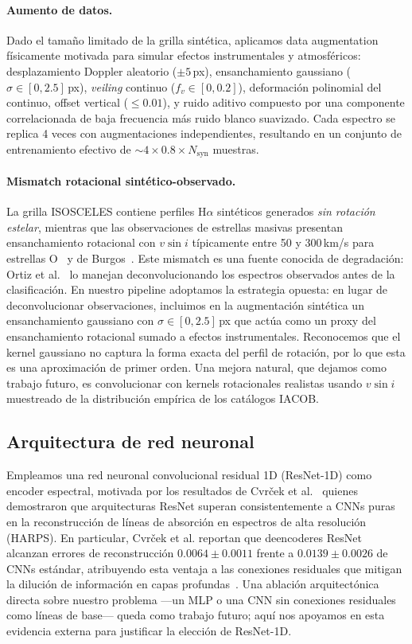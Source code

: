 \documentclass[sigconf,ACM]{acmart}
\begin{document}
\paragraph{Aumento de datos.}
Dado el tamaño limitado de la grilla sintética, aplicamos data augmentation
físicamente motivada para simular efectos instrumentales y atmosféricos:
desplazamiento Doppler aleatorio ($\pm 5$\,px), ensanchamiento gaussiano
($\sigma \in [0, 2.5]$\,px), \emph{veiling} continuo
($f_v \in [0, 0.2]$), deformación polinomial del continuo, offset vertical ($\leq 0.01$), y ruido aditivo compuesto por una componente correlacionada de baja frecuencia más ruido blanco suavizado.
Cada espectro se replica 4 veces con augmentaciones independientes, resultando
en un conjunto de entrenamiento efectivo de ${\sim}4 \times 0.8 \times
N_{\mathrm{syn}}$ muestras.

\paragraph{Mismatch rotacional sintético-observado.}
La grilla ISOSCELES contiene perfiles H$\alpha$ sintéticos generados \emph{sin rotación estelar}, mientras que las observaciones de estrellas masivas presentan ensanchamiento rotacional con $v\sin i$ típicamente entre 50 y 300\,km/s para estrellas O~\cite{Holgado2025} y de Burgos~\cite{deBurgos2024}. Este mismatch es una fuente conocida de degradación: Ortiz et al.~\cite{Ortiz2025} lo manejan deconvolucionando los espectros observados antes de la clasificación. En nuestro pipeline adoptamos la estrategia opuesta: en lugar de deconvolucionar observaciones, incluimos en la augmentación sintética un ensanchamiento gaussiano con $\sigma \in [0, 2.5]$\,px que actúa como un proxy del ensanchamiento rotacional sumado a efectos instrumentales. Reconocemos que el kernel gaussiano no captura la forma exacta del perfil de rotación, por lo que esta es una aproximación de primer orden. Una mejora natural, que dejamos como trabajo futuro, es convolucionar con kernels rotacionales realistas usando $v\sin i$ muestreado de la distribución empírica de los catálogos IACOB.

\subsection{Arquitectura de red neuronal}
\label{subsec:arquitectura}

Empleamos una red neuronal convolucional residual 1D (ResNet-1D) como encoder espectral, motivada por los resultados de Cvrček et al.~\cite{Cvrcek2025} quienes demostraron que arquitecturas ResNet superan consistentemente a CNNs puras en la reconstrucción de líneas de absorción en espectros de alta resolución (HARPS). En particular, Cvrček et al. reportan que deencoderes ResNet alcanzan errores de reconstrucción $0.0064 \pm 0.0011$ frente a $0.0139 \pm 0.0026$ de CNNs estándar, atribuyendo esta ventaja a las conexiones residuales que mitigan la dilución de información en capas profundas~\cite[Sect.~4.2.1]{Cvrcek2025}. Una ablación arquitectónica directa sobre nuestro problema ---un MLP o una CNN sin conexiones residuales como líneas de base--- queda como trabajo futuro; aquí nos apoyamos en esta evidencia externa para justificar la elección de ResNet-1D.
\end{document}
